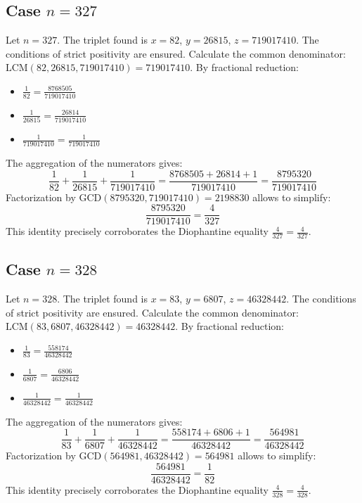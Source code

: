 \documentclass[11pt,a4paper]{article}
\begin{document}
\subsection{Case $n = 327$}
Let $n = 327$. The triplet found is $x = 82$, $y = 26815$, $z = 719017410$.
The conditions of strict positivity are ensured.
Calculate the common denominator: $\text{LCM}(82, 26815, 719017410) = 719017410$.
By fractional reduction:
\begin{itemize}
    \item $\frac{1}{82} = \frac{8768505}{719017410}$
    \item $\frac{1}{26815} = \frac{26814}{719017410}$
    \item $\frac{1}{719017410} = \frac{1}{719017410}$
\end{itemize}
The aggregation of the numerators gives:
$$ \frac{1}{82} + \frac{1}{26815} + \frac{1}{719017410} = \frac{8768505 + 26814 + 1}{719017410} = \frac{8795320}{719017410} $$
Factorization by $\text{GCD}(8795320, 719017410) = 2198830$ allows to simplify:
$$ \frac{8795320}{719017410} = \frac{4}{327} $$
This identity precisely corroborates the Diophantine equality $\frac{4}{327} = \frac{4}{327}$.

\subsection{Case $n = 328$}
Let $n = 328$. The triplet found is $x = 83$, $y = 6807$, $z = 46328442$.
The conditions of strict positivity are ensured.
Calculate the common denominator: $\text{LCM}(83, 6807, 46328442) = 46328442$.
By fractional reduction:
\begin{itemize}
    \item $\frac{1}{83} = \frac{558174}{46328442}$
    \item $\frac{1}{6807} = \frac{6806}{46328442}$
    \item $\frac{1}{46328442} = \frac{1}{46328442}$
\end{itemize}
The aggregation of the numerators gives:
$$ \frac{1}{83} + \frac{1}{6807} + \frac{1}{46328442} = \frac{558174 + 6806 + 1}{46328442} = \frac{564981}{46328442} $$
Factorization by $\text{GCD}(564981, 46328442) = 564981$ allows to simplify:
$$ \frac{564981}{46328442} = \frac{1}{82} $$
This identity precisely corroborates the Diophantine equality $\frac{4}{328} = \frac{4}{328}$.
\end{document}
